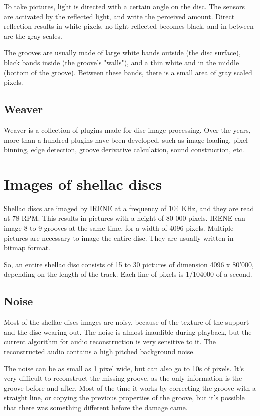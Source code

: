 \documentclass[12pt, twoside]{article}
\begin{document}
To take pictures, light is directed with a certain angle on the disc. The sensors are activated by the reflected light, and write the perceived amount. Direct reflection results in white pixels, no light reflected becomes black, and in between are the gray scales.


The grooves are usually made of large white bands outside (the disc surface), black bands inside (the groove's "walls"), and a thin white and in the middle (bottom of the groove). Between these bands, there is a small area of gray scaled pixels.

\subsection{Weaver}
Weaver is a collection of plugins made for disc image processing. Over the years, more than a hundred plugins have been developed, such as image loading, pixel binning, edge detection, groove derivative calculation, sound construction, etc.
\section{Images of shellac discs}
Shellac discs are imaged by IRENE at a frequency of 104 KHz, and they are read at 78 RPM. This results in pictures with a height of 80 000 pixels. IRENE can image 8 to 9 grooves at the same time, for a width of 4096 pixels. Multiple pictures are necessary to image the entire disc. They are usually written in bitmap format.

So, an entire shellac disc consists of 15 to 30 pictures of dimension 4096 x 80'000, depending on the length of the track. Each line of pixels is 1/104000 of a second. 
\subsection{Noise}
Most of the shellac discs images are noisy, because of the texture of the support and the disc wearing out. The noise is almost inaudible during playback, but the current algorithm for audio reconstruction is very sensitive to it. The reconstructed audio contains a high pitched background noise.

The noise can be as small as 1 pixel wide, but can also go to 10s of pixels. It's very difficult to reconstruct the missing groove, as the only information is the groove before and after. Most of the time it works by correcting the groove with a straight line, or copying the previous properties of the groove, but it's possible that there was something different before the damage came.
\end{document}
